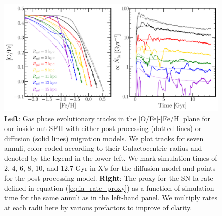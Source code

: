 \documentclass[fleqn, usenatbib]{mnras}
\newcommand{\refp}[1]{(\ref{#1})}
\begin{document}
\begin{figure} 
\centering 
\includegraphics[scale = 0.42]{tracks.pdf} 
\caption{\textbf{Left}: Gas phase evolutionary tracks in the [O/Fe]-[Fe/H] 
plane for our inside-out SFH with either post-processing (dotted lines) or 
diffusion (solid lines) migration models. We plot tracks for seven annuli, 
color-coded according to their Galactocentric radius and denoted by the legend 
in the lower-left. We mark simulation times of 2, 4, 6, 8, 10, and 12.7 Gyr in 
X's for the diffusion model and points for the post-processing model. 
\textbf{Right}: The proxy for the SN Ia rate defined in equation 
\refp{eq:ia_rate_proxy} as a function of simulation time for the same annuli 
as in the left-hand panel. We multiply rates at each radii here by various 
prefactors to improve of clarity. }
\label{fig:tracks} 
\end{figure} 
\end{document}
